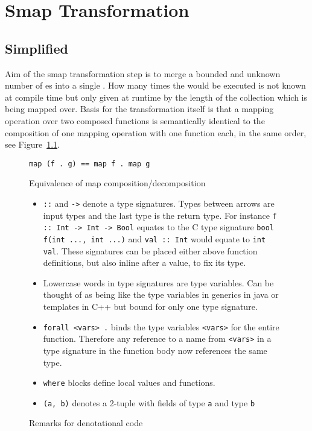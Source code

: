 \chapter{Smap Transformation}

\label{ch:smap-transformation}

\section{Simplified}

Aim of the smap transformation step is to merge a bounded and unknown number of \fetch{}es into a single \fetch{}.
How many times the \fetch{} would be executed is not known at compile time but only given at runtime by the length of the collection which is being mapped over.
Basis for the transformation itself is that a mapping operation over two composed functions is semantically identical to the composition of one mapping operation with one function each, in the same order, see Figure~\ref{fig:map-comp-decomp}.

\begin{figure}
\begin{verbatim}
map (f . g) == map f . map g
\end{verbatim}
    \caption{Equivalence of map composition/decomposition}
    \label{fig:map-comp-decomp}
\end{figure}

\begin{figure}[h]
    \begin{itemize}
        \item \texttt{::} and \texttt{->} denote a type signatures. Types between arrows are input types and the last type is the return type.
        For instance \texttt{f :: Int -> Int -> Bool} equates to the C type signature \texttt{bool f(int ..., int ...)} and \texttt{val :: Int} would equate to \texttt{int val}.
        These signatures can be placed either above function definitions, but also inline after a value, to fix its type.
        \item Lowercase words in type signatures are type variables. Can be thought of as being like the type variables in generics in java or templates in C++ but bound for only one type signature.
        \item \texttt{forall <vars> .} binds the type variables \texttt{<vars>} for the entire function. Therefore any reference to a name from \texttt{<vars>} in a type signature in the function body now references the same type.
        \item \texttt{where} blocks define local values and functions.
        \item \texttt{(a, b)} denotes a 2-tuple with fields of type \texttt{a} and type \texttt{b}
    \end{itemize}
    \caption{Remarks for denotational code}
\end{figure}

